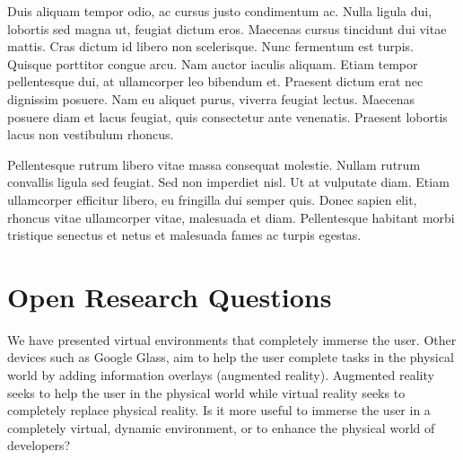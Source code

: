 \documentclass{acm_proc_article-sp}
\begin{document}
Duis aliquam tempor odio, ac cursus justo condimentum ac. Nulla ligula dui, lobortis sed magna ut, feugiat dictum eros. Maecenas cursus tincidunt dui vitae mattis. Cras dictum id libero non scelerisque. Nunc fermentum est turpis. Quisque porttitor congue arcu. Nam auctor iaculis aliquam. Etiam tempor pellentesque dui, at ullamcorper leo bibendum et. Praesent dictum erat nec dignissim posuere. Nam eu aliquet purus, viverra feugiat lectus. Maecenas posuere diam et lacus feugiat, quis consectetur ante venenatis. Praesent lobortis lacus non vestibulum rhoncus.

Pellentesque rutrum libero vitae massa consequat molestie. Nullam rutrum convallis ligula sed feugiat. Sed non imperdiet nisl. Ut at vulputate diam. Etiam ullamcorper efficitur libero, eu fringilla dui semper quis. Donec sapien elit, rhoncus vitae ullamcorper vitae, malesuada et diam. Pellentesque habitant morbi tristique senectus et netus et malesuada fames ac turpis egestas. 

\section{Open Research Questions}
We have presented virtual environments that completely immerse the user. Other devices such as Google Glass, aim to help the user complete tasks in the physical world by adding information overlays (augmented reality). Augmented reality seeks to help the user in the physical world while virtual reality seeks to completely replace physical reality. 
Is it more useful to immerse the user in a completely virtual, dynamic environment, or to enhance the physical world of developers?
  
\end{document}
